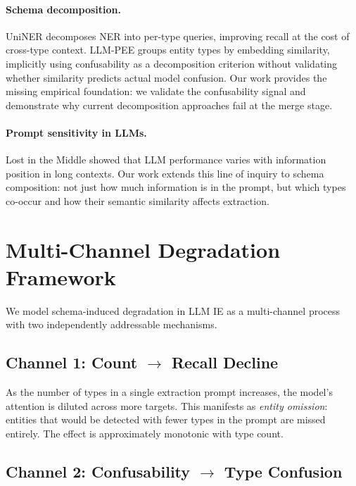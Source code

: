 \documentclass[11pt,a4paper]{article}
\begin{document}
\paragraph{Schema decomposition.}
UniNER decomposes NER into per-type queries, improving recall at the cost of cross-type context.
LLM-PEE groups entity types by embedding similarity, implicitly using confusability as a decomposition criterion without validating whether similarity predicts actual model confusion.
Our work provides the missing empirical foundation: we validate the confusability signal and demonstrate why current decomposition approaches fail at the merge stage.

\paragraph{Prompt sensitivity in LLMs.}
Lost in the Middle showed that LLM performance varies with information position in long contexts.
Our work extends this line of inquiry to schema composition: not just how much information is in the prompt, but which types co-occur and how their semantic similarity affects extraction.

\section{Multi-Channel Degradation Framework}

We model schema-induced degradation in LLM IE as a multi-channel process with two independently addressable mechanisms.

\subsection{Channel 1: Count $\rightarrow$ Recall Decline}

As the number of types in a single extraction prompt increases, the model's attention is diluted across more targets. This manifests as \emph{entity omission}: entities that would be detected with fewer types in the prompt are missed entirely. The effect is approximately monotonic with type count.

\subsection{Channel 2: Confusability $\rightarrow$ Type Confusion}
\end{document}
